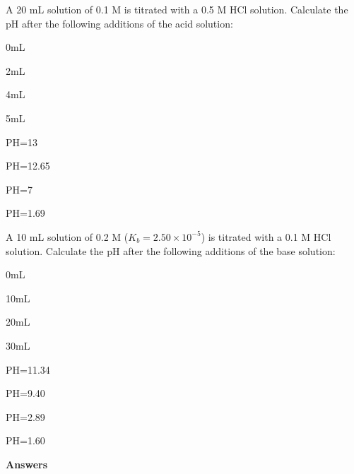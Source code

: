 \documentclass[main.tex]{subfiles}
\begin{document}
\begin{multicols*}{2}
\begin{question}[ID=\the\value{numA}]
A 20 mL solution of 0.1 M  is titrated with a 0.5 M HCl solution. Calculate the pH after the following additions of the acid solution: 
\begin{inparaenum}[(a)]
\item  0mL  	%
\item  2mL		%
\item  4mL		%
\item  5mL		%
 \end{inparaenum}
\end{question}
\begin{solution}
\begin{inparaenum}[(a)]
\item   PH=13
\item   PH=12.65
\item   PH=7
\item   PH=1.69
 \end{inparaenum}
\hspace{0.1cm}\end{solution}%

\begin{question}[ID=\the\value{numA}]
A 10 mL solution of 0.2 M  ($K_b=2.50 \times 10^{-5}$) is titrated with a 0.1 M HCl solution. Calculate the pH after the following additions of the base solution: 
\begin{inparaenum}[(a)]
\item  0mL  	%
\item  10mL	%
\item  20mL	%
\item  30mL	%
 \end{inparaenum}
\end{question}
\begin{solution}
\begin{inparaenum}[(a)]
 \item  PH=11.34 
\item   PH=9.40  
\item   PH=2.89  
\item   PH=1.60 
 \end{inparaenum}
\hspace{0.1cm}\end{solution}%


\end{multicols*}

\newpage
\begin{answersenvironment}
\begin{minipage}[c]{1\textwidth}
\begin{localsize}{10}
{\Large \bf Answers}
  \printsolutions[byID={1,3,5,7,9,11,13,15,17,19,21,23,25,27,29,31,33,35,37, 39}]
\end{localsize}
\end{minipage}\end{answersenvironment}
\end{document}
